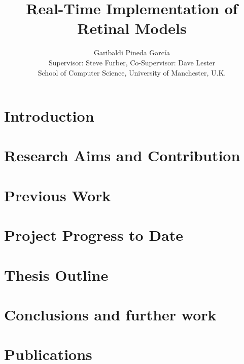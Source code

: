 \documentclass[a4paper]{IEEEtran}
\title{Real-Time Implementation of Retinal Models}
\author{Garibaldi Pineda Garc\'ia\\
        Supervisor: Steve Furber, Co-Supervisor: Dave Lester\\
        School of Computer Science, University of Manchester, U.K.}
\date{}
\begin{document}
\thispagestyle{empty}
%
\maketitle


\begin{abstract}

\end{abstract}

\section{Introduction}
\label{sec-intro}


\section{Research Aims and Contribution}
\label{sec-aims-contribs}


\section{Previous Work}
\label{sec-prev-work}


\section{Project Progress to Date}
\label{sec-project-progress}


\section{Thesis Outline}
\label{sec-thesis-toc}


\section{Conclusions and further work}
\label{sec-conclusions}


\section{Publications}
\label{sec-publications}

\end{document}

